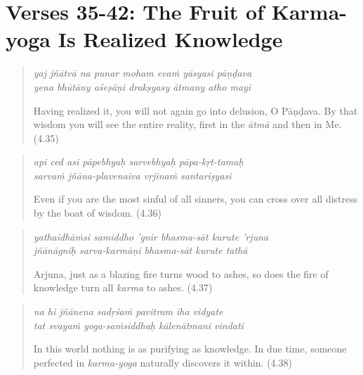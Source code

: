 \documentclass[12pt, twoside, openright]{memoir}
\begin{document}
\section{Verses 35-42: The Fruit of Karma-yoga Is Realized Knowledge}\label{sec-verses-35-42-the-fruit-of-karma-yoga-is-realized-knowledge}

\par
\begin{verse}
\textit{yaj jñātvā na punar moham evaṁ yāsyasi pāṇḍava} \\
\textit{yena bhūtāny aśeṣāṇi drakṣyasy ātmany atho mayi}

\noindent Having realized it, you will not again go into delusion, O Pāṇḍava. By that wisdom you will see the entire reality, first in the \textit{ātmā} and then in Me. (4.35)
\end{verse}
\par



\par
\begin{verse}
\textit{api ced asi pāpebhyaḥ sarvebhyaḥ pāpa-kṛt-tamaḥ} \\
\textit{sarvaṁ jñāna-plavenaiva vṛjinaṁ santariṣyasi}

\noindent Even if you are the most sinful of all sinners, you can cross over all distress by the boat of wisdom. (4.36)
\end{verse}
\par



\par
\begin{verse}
\textit{yathaidhāṁsi samiddho ’gnir bhasma-sāt kurute ’rjuna} \\
\textit{jñānāgniḥ sarva-karmāṇi bhasma-sāt kurute tathā}

\noindent Arjuna, just as a blazing fire turns wood to ashes, so does the fire of knowledge turn all \textit{karma} to ashes. (4.37)
\end{verse}
\par



\par
\begin{verse}
\textit{na hi jñānena sadṛśaṁ pavitram iha vidyate} \\
\textit{tat svayaṁ yoga-saṁsiddhaḥ kālenātmani vindati}

\noindent In this world nothing is as purifying as knowledge. In due time, someone perfected in \textit{karma-yoga} naturally discovers it within. (4.38)
\end{verse}
\par
\end{document}
